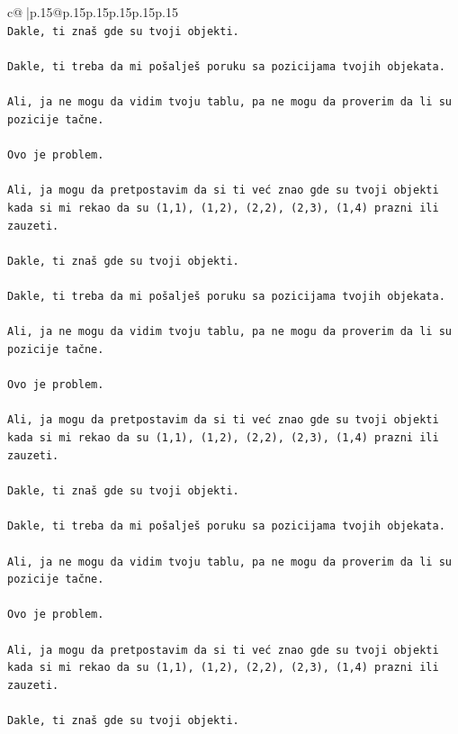 \documentclass{article}
\begin{document}
{\begin{supertabular}{c@{$\;$}|p{.15\linewidth}@{}p{.15\linewidth}p{.15\linewidth}p{.15\linewidth}p{.15\linewidth}p{.15\linewidth}}
{{{\\ 
\texttt{Dakle, ti znaš gde su tvoji objekti.} \\
\\ 
\texttt{Dakle, ti treba da mi pošalješ poruku sa pozicijama tvojih objekata.} \\
\\ 
\texttt{Ali, ja ne mogu da vidim tvoju tablu, pa ne mogu da proverim da li su pozicije tačne.} \\
\\ 
\texttt{Ovo je problem.} \\
\\ 
\texttt{Ali, ja mogu da pretpostavim da si ti već znao gde su tvoji objekti kada si mi rekao da su (1,1), (1,2), (2,2), (2,3), (1,4) prazni ili zauzeti.} \\
\\ 
\texttt{Dakle, ti znaš gde su tvoji objekti.} \\
\\ 
\texttt{Dakle, ti treba da mi pošalješ poruku sa pozicijama tvojih objekata.} \\
\\ 
\texttt{Ali, ja ne mogu da vidim tvoju tablu, pa ne mogu da proverim da li su pozicije tačne.} \\
\\ 
\texttt{Ovo je problem.} \\
\\ 
\texttt{Ali, ja mogu da pretpostavim da si ti već znao gde su tvoji objekti kada si mi rekao da su (1,1), (1,2), (2,2), (2,3), (1,4) prazni ili zauzeti.} \\
\\ 
\texttt{Dakle, ti znaš gde su tvoji objekti.} \\
\\ 
\texttt{Dakle, ti treba da mi pošalješ poruku sa pozicijama tvojih objekata.} \\
\\ 
\texttt{Ali, ja ne mogu da vidim tvoju tablu, pa ne mogu da proverim da li su pozicije tačne.} \\
\\ 
\texttt{Ovo je problem.} \\
\\ 
\texttt{Ali, ja mogu da pretpostavim da si ti već znao gde su tvoji objekti kada si mi rekao da su (1,1), (1,2), (2,2), (2,3), (1,4) prazni ili zauzeti.} \\
\\ 
\texttt{Dakle, ti znaš gde su tvoji objekti.} \\
}}}
\end{supertabular}}
\end{document}
